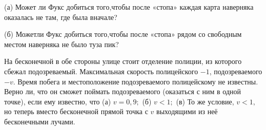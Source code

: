 (а) Может ли Фукс добиться того,чтобы после «стопа» каждая карта наверняка оказалась не там, где была вначале?

(б) Можетли Фукс добиться того,чтобы после «стопа» рядом со свободным местом наверняка не было туза пик?

 На бесконечной в обе стороны улице стоит отделение полиции, из которого сбежал подозреваемый. Максимальная скорость полицейского $- 1$, подозреваемого $- v$. Время побега и местоположение подозреваемого полицейскому не известны. Верно ли, что он сможет поймать подозреваемого (оказаться с ним в одной точке), если ему известно, что 
(а) $v = 0,9;$ (б) $v < 1;$ (в) То же условие, $v < 1,$ но теперь вместо бесконечной прямой точка с $v$ выходящими из неё бесконечными лучами.